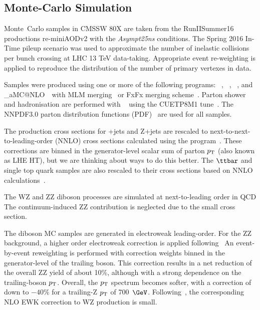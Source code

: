 \clearpage
\subsection{Monte-Carlo Simulation}
\label{sec:bkgsamples}

Monte~Carlo samples in CMSSW 80X are taken from the RunIISummer16  productions re-miniAODv2 with the {\it Asympt25ns} conditions. The Spring 2016 In-Time pileup scenario was used to approximate the number of inelastic collisions per bunch crossing at LHC 13 TeV data-taking. Appropriate event re-weighting is applied to reproduce the distribution of the number of primary vertexes in data. 

Samples were produced using one or more of the following programs:
~\cite{Sjostrand:2006za,Sjostrand:2007gs}, \POWHEG~\cite{Nason:2004rx}, \TAUOLA~\cite{Golonka:2003xt}, 
and \_aMC@NLO~\cite{Alwall:2011uj,Alwall:2014hca}\
with {\sc MLM} merging~\cite{Mangano:2006rw} or FxFx merging scheme~\cite{Frederix:2012ps}.
Parton shower and hadronisation are performed with \PYTHIA8~\cite{Sjostrand:2007gs} using the CUETP8M1 tune~\cite{Khachatryan:2015pea}.
The {\sc NNPDF3.0} parton distribution functions (PDF)~\cite{Ball:2014uwa} are used for all samples.

The production cross sections for \PW+jets and Z+jets are rescaled to next-to-next-to-leading-order (NNLO)
cross sections calculated using the \FEWZ 3.1 program~\cite{Gavin:2010az,Li:2012wna,Gavin:2012sy}.
These corrections are binned in the generator-level scalar sum of parton $p_{\mathrm{T}}$ (also known as LHE HT),
but we are thinking about ways to do this better.
The $\ttbar$ and single top quark samples are also rescaled to their cross sections based on
NNLO calculations~\cite{Czakon:2013goa, Kidonakis:2012db}.

The WZ and ZZ diboson processes are simulated at next-to-leading order in QCD
The continuum-induced ZZ contribution is neglected due to the small cross section.

The diboson MC samples are generated in electroweak leading-order. For the ZZ
background, a higher order electroweak correction is applied following~\cite{Bierweiler:2013dja,Gieseke:2014gka}  An event-by-event reweighting is performed with correction weights binned in the generator-level \pt of the trailing boson.
This correction results in a net reduction of the overall ZZ yield of about 10\%, although with a strong dependence on the trailing-boson $p_{\mathrm{T}}$.
Overall, the $p_{\mathrm{T}}$ spectrum becomes softer, with a correction of down to $-40\%$ for a trailing-Z $p_{\mathrm{T}}$ of 700~$\GeV$. 
Following~\cite{Baglio:113005}, the corresponding NLO EWK correction to WZ production is small.

